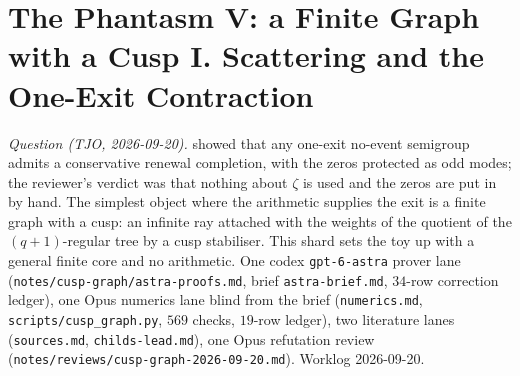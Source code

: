 
\section{The Phantasm V: a Finite Graph with a Cusp I. Scattering and the One-Exit Contraction}
\label{sec:cusp-graph-scattering}

\emph{Question (TJO, 2026-09-20).}  showed that any one-exit no-event
semigroup admits a conservative renewal completion, with the zeros protected as odd modes; the reviewer's
verdict was that nothing about $\zeta$ is used and the zeros are put in by hand. The simplest object where
the arithmetic supplies the exit is a finite graph with a cusp: an infinite ray attached with the weights
of the quotient of the $(q+1)$-regular tree by a cusp stabiliser. This shard sets the toy up with a general
finite core and no arithmetic. One codex \texttt{gpt-6-astra} prover lane (\texttt{notes/cusp-graph/astra-proofs.md},
brief \texttt{astra-brief.md}, $34$-row correction ledger), one Opus numerics lane blind from the brief
(\texttt{numerics.md}, \texttt{scripts/cusp\_graph.py}, $569$ checks, $19$-row ledger), two literature lanes
(\texttt{sources.md}, \texttt{childs-lead.md}), one Opus refutation review
(\texttt{notes/reviews/cusp-graph-2026-09-20.md}). Worklog 2026-09-20.


